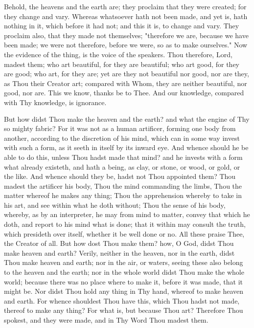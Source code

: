 \documentclass[b5paper,openright,12pt,twoside]{book}
\begin{document}
Behold, the heavens and the earth are; they proclaim that they were
created; for they change and vary. Whereas whatsoever hath not been
made, and yet is, hath nothing in it, which before it had not; and
this it is, to change and vary. They proclaim also, that they made not
themselves; "therefore we are, because we have been made; we were not
therefore, before we were, so as to make ourselves." Now the evidence
of the thing, is the voice of the speakers. Thou therefore, Lord, madest
them; who art beautiful, for they are beautiful; who art good, for they
are good; who art, for they are; yet are they not beautiful nor good,
nor are they, as Thou their Creator art; compared with Whom, they are
neither beautiful, nor good, nor are. This we know, thanks be to Thee.
And our knowledge, compared with Thy knowledge, is ignorance.

But how didst Thou make the heaven and the earth? and what the engine of
Thy so mighty fabric? For it was not as a human artificer, forming one
body from another, according to the discretion of his mind, which can
in some way invest with such a form, as it seeth in itself by its inward
eye. And whence should he be able to do this, unless Thou hadst made
that mind? and he invests with a form what already existeth, and hath
a being, as clay, or stone, or wood, or gold, or the like. And whence
should they be, hadst not Thou appointed them? Thou madest the artificer
his body, Thou the mind commanding the limbs, Thou the matter whereof he
makes any thing; Thou the apprehension whereby to take in his art, and
see within what he doth without; Thou the sense of his body, whereby,
as by an interpreter, he may from mind to matter, convey that which he
doth, and report to his mind what is done; that it within may consult
the truth, which presideth over itself, whether it be well done or no.
All these praise Thee, the Creator of all. But how dost Thou make them?
how, O God, didst Thou make heaven and earth? Verily, neither in the
heaven, nor in the earth, didst Thou make heaven and earth; nor in the
air, or waters, seeing these also belong to the heaven and the earth;
nor in the whole world didst Thou make the whole world; because there
was no place where to make it, before it was made, that it might be. Nor
didst Thou hold any thing in Thy hand, whereof to make heaven and earth.
For whence shouldest Thou have this, which Thou hadst not made, thereof
to make any thing? For what is, but because Thou art? Therefore Thou
spokest, and they were made, and in Thy Word Thou madest them.
\end{document}

